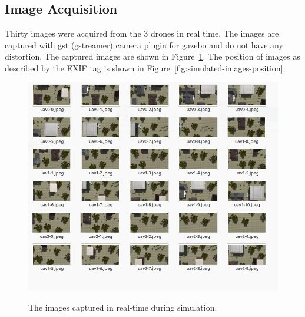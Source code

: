 \subsection{Image Acquisition}
Thirty images were acquired from the 3 drones in real time. The images are captured with gst (gstreamer) camera plugin for gazebo and do not have any distortion. The captured images are shown in Figure~\ref{fig:simulated-images}. The position of images as described by the EXIF tag is shown in Figure~\ref{fig:simulated-images-position}.
\begin{figure}
	\centering
	\caption[The images captures in real-time during simulation.]{\small The images captured in real-time during simulation.} 
	\includegraphics[width=6in]{figures/experiment/simulated-images}
	\label{fig:simulated-images}
\end{figure}

